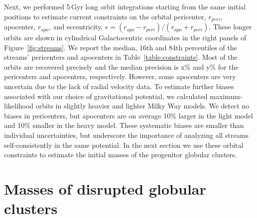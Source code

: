 \documentclass[twocolumn]{aastex63}
\begin{document}
Next, we performed 5\,Gyr long orbit integrations starting from the same initial positions to estimate current constraints on the orbital pericenter, $r_{peri}$, apocenter, $r_{apo}$, and eccentricity, $e=(r_{apo} - r_{peri})/(r_{apo} + r_{peri})$.
These longer orbits are shown in cylindrical Galactocentric coordinates in the right panels of Figure~\ref{fig:streams}.
We report the median, 16th and 84th percentiles of the streams' pericenters and apocenters in Table~\ref{table:constraints}.
Most of the orbits are recovered precisely and the median precision is x\% and y\% for the pericenters and apocenters, respectively.
However, some apocenters are very uncertain due to the lack of radial velocity data.
To estimate further biases associated with our choice of gravitational potential, we calculated maximum-likelihood orbits in slightly heavier \citep[used in][]{pwb, bonaca:2019a} and lighter \citep{bovy:2015} Milky Way models.
We detect no biases in pericenters, but apocenters are on average 10\% larger in the light model and 10\% smaller in the heavy model.
These systematic biases are smaller than individual uncertainties, but underscore the importance of analyzing all streams self-consistently in the same potential.
In the next section we use these orbital constraints to estimate the initial masses of the progenitor globular clusters.

\section{Masses of disrupted globular clusters}
\label{sec:disrupted}
\end{document}
